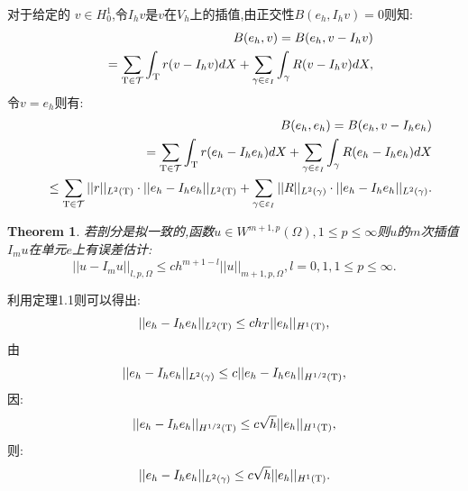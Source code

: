 \documentclass[9pt, a4paper,eqno]{article}
\theoremstyle{plain}
\newtheorem{theorem}{Theorem}[section]
\begin{document}
\begin{CJK}{UTF8}{gkai}
对于给定的 $ v \in H_{0}^{1}$,令$I_{h}v$是$v$在$V_{h}$上的插值,由正交性$B(e_{h},I_{h}v)=0$则知:
\begin{eqnarray}
&& B(e_{h},v)= B(e_{h},v-I_{h}v) 
\nonumber\\&& = \sum_{ \rm T \in \mathcal{T} }   \int _{\rm T } r(v-I_{h}v) dX +        \sum_{ \gamma \in \varepsilon _{I} } \int _{\gamma}R(v-I_{h}v)dX,
\label{A1anotherboun}
\end{eqnarray}
令$v = e_{h} $则有:
\begin{eqnarray}
&& B(e_{h},e_{h})= B(e_{h},v-I_{h}e_{h}) 
\nonumber\\&& = \sum_{ \rm T \in \mathcal{T} }   \int _{\rm T } r(e_{h}-I_{h}e_{h}) dX +        \sum_{ \gamma \in \varepsilon _{I} } \int _{\gamma}R(e_{h}-I_{h}e_{h})dX
\nonumber\\&& \leq \sum_{ \rm T \in \mathcal{T} } || r|| _{L^{2}(\rm T)} \cdot || e_{h} - I_{h}e_{h} || _{L^{2}(\rm T)} + \sum_{ \gamma \in \varepsilon_{I} } || R|| _{L^{2}(\gamma)} \cdot || e_{h} - I_{h}e_{h} || _{L^{2}(\gamma)}.
\label{A1anotherboun}
\end{eqnarray}

\begin{theorem}
若剖分是拟一致的,函数$u \in W^{m+1,p}(\Omega) , 1 \leq p \leq \infty$则$u$的$m$次插值$I_{m}u$在单元$e$上有误差估计:
$$||u-I_{m}u||_{l,p,\Omega} \leq ch^{m+1-l} ||u ||_{m+1,p,\Omega},l=0,1,1\leq p \leq \infty.$$
\end{theorem}

利用定理1.1则可以得出:
\begin{equation}
||e_{h} - I_{h}e_{h}||_{L^{2}(\rm T)} \leq ch_{T} ||e_{h}||_{H^{1}(\rm T)}   ,
\end{equation}
由 $$||e_{h} - I_{h}e_{h} ||_{L^{2}(\gamma)} \leq c ||e_{h} - I_{h}e_{h} ||_{H^{1/2}(\rm T)}, $$
因:
$$||e_{h}-I_{h}e_{h}||_{H^{1/2}(\rm T)} \leq c \sqrt{h} ||e_{h}||_{H^{1}(\rm T)},$$
则:
\begin{equation}
||e_{h} - I_{h}e_{h} ||_{L^{2}(\gamma)} \leq c \sqrt{h} ||e_{h}||_{H^{1}(\rm T)}.
\end{equation}


\end{CJK}
\end{document}
